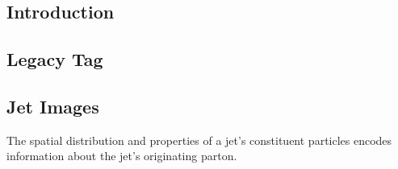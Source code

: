 \subsection{Introduction}

\subsection{Legacy Tag}


\subsection{Jet Images}
The spatial distribution and properties of a jet's constituent particles encodes information about the jet's originating parton. 

\begin{figure}[h!]


\end{figure}
